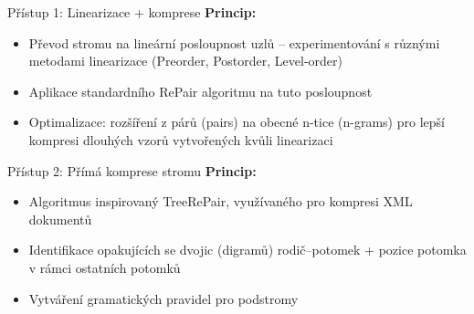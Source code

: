 \documentclass[lualatex,hyperref={pdfencoding=auto}]{beamer}
\begin{document}
\begin{frame}{Přístup 1: Linearizace + komprese}
    \textbf{Princip:}
    \begin{itemize}
        \item Převod stromu na lineární posloupnost uzlů -- experimentování s různými metodami linearizace (Preorder, Postorder, Level-order)
        \item Aplikace standardního RePair algoritmu na tuto posloupnost
        \item Optimalizace: rozšíření z párů (pairs) na obecné n-tice (n-grams) pro lepší kompresi dlouhých vzorů vytvořených kvůli linearizaci
    \end{itemize}    
\end{frame}

\begin{frame}{Přístup 2: Přímá komprese stromu}
    \textbf{Princip:}
    \begin{itemize}
        \item Algoritmus inspirovaný TreeRePair, využívaného pro kompresi XML dokumentů \nocite{lohrey2013xml}
        \item Identifikace opakujících se dvojic (digramů) rodič--potomek + pozice potomka v rámci ostatních potomků 
        \item Vytváření gramatických pravidel pro podstromy
    \end{itemize}
    
\end{frame}

    
\end{document}
